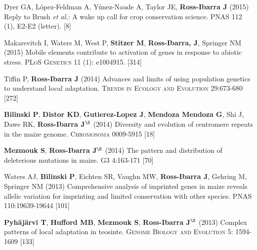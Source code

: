 \documentclass[letterpaper,10pt]{article}
\begin{document}
\begin{etaremune}
\item Dyer GA, L\'opez-Feldman A, Y\'unez-Naude A, Taylor JE, {\bf Ross-Ibarra J} (2015) Reply to Brush \emph{et al.}: A wake up call for crop conservation science. PNAS 112 (1), E2-E2 (letter).
 [8]\\


\item Makarevitch I, Waters M, West P, {\bf Stitzer M}, {\bf Ross-Ibarra, J}, Springer NM (2015) Mobile elements contribute to activation of genes in response to abiotic stress. \textsc{PLoS Genetics} 11 (1): e1004915. %
 [314]\\


\item Tiffin P, {\bf Ross-Ibarra J} (2014) Advances and limits of using population genetics to understand local adaptation. \textsc{Trends in Ecology and Evolution} 29:673-680 %
 [272]\\


\item {\bf Bilinski P}, {\bf Distor KD}, {\bf Gutierez-Lopez J}, {\bf Mendoza Mendoza G}, Shi J, Dawe RK,  {\bf Ross-Ibarra J}$^\S$ (2014) Diversity and evolution of centromere repeats in the maize genome. \textsc{Chromosoma} 0009-5915
 [18]\\

\item {\bf Mezmouk S}, {\bf Ross-Ibarra J}$^\S$ (2014) The pattern and distribution of deleterious mutations in maize. \textsc{G3} 4:163-171
 [70]\\

\item Waters AJ, {\bf Bilinski P}, Eichten SR, Vaughn MW, {\bf Ross-Ibarra J}, Gehring M, Springer NM (2013) Comprehensive analysis of imprinted genes in maize reveals allelic variation for imprinting and limited conservation with other species. \textsc{PNAS} 110:19639-19644
 [101]\\


\item {\bf Pyh\"aj\"arvi T}, {\bf Hufford MB}, {\bf Mezmouk S}, {\bf Ross-Ibarra J}$^\S$ (2013) Complex patterns of local adaptation in teosinte. \textsc{Genome Biology and Evolution} 5: 1594-1609 %
 [133]\\



\end{etaremune}
\end{document}
